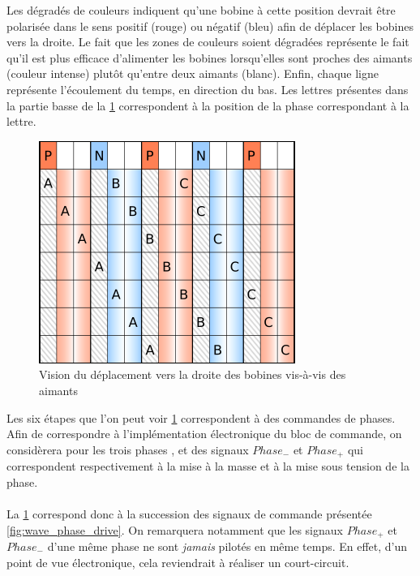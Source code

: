 Les dégradés de couleurs indiquent qu'une bobine à cette position devrait être polarisée dans le sens positif (rouge) ou négatif (bleu) afin de déplacer les bobines vers la droite.
Le fait que les zones de couleurs soient dégradées représente le fait qu'il est plus efficace d'alimenter les bobines lorsqu'elles sont proches des aimants (couleur intense) plutôt qu'entre deux aimants (blanc).
Enfin, chaque ligne représente l'écoulement du temps, en direction du bas.
Les lettres présentes dans la partie basse de la \cref{fig:bobines_vs_aimants} correspondent à la position de la phase correspondant à la lettre.
\begin{figure}[h]
    \centering
    \includegraphics{png/phases_aimants_switching.png}
    \caption{Vision du déplacement vers la droite des bobines vis-à-vis des aimants}
    \label{fig:bobines_vs_aimants}
\end{figure}

Les six étapes que l'on peut voir \cref{fig:bobines_vs_aimants} correspondent à des commandes de phases.
Afin de correspondre à l'implémentation électronique du bloc de commande, on considèrera pour les trois phases \pha, \phb et \phc des signaux $\mathit{Phase}_-$ et $\mathit{Phase}_+$
qui correspondent respectivement à la mise à la masse et à la mise sous tension de la phase.

\paragraph{}
La \cref{fig:bobines_vs_aimants} correspond donc à la succession des signaux de commande présentée \cref{fig:wave_phase_drive}. 
On remarquera notamment que les signaux $\mathit{Phase}_+$ et $\mathit{Phase}_-$ d'une même phase ne sont \emph{jamais} pilotés en même temps.
En effet, d'un point de vue électronique, cela reviendrait à réaliser un court-circuit. 

